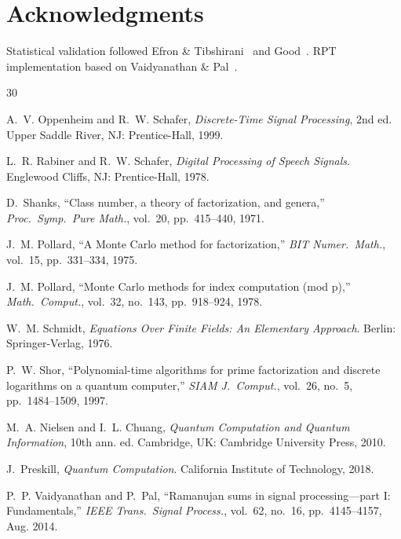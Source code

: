 \documentclass[10pt,twocolumn]{article}
\begin{document}
\section*{Acknowledgments}

Statistical validation followed Efron \& Tibshirani~\cite{efron1993} and Good~\cite{good2013}. RPT implementation based on Vaidyanathan \& Pal~\cite{vaidyanathan2014}.

\begin{thebibliography}{30}

A.~V. Oppenheim and R.~W. Schafer, \emph{Discrete-Time Signal Processing}, 2nd ed. Upper Saddle River, NJ: Prentice-Hall, 1999.

L.~R. Rabiner and R.~W. Schafer, \emph{Digital Processing of Speech Signals}. Englewood Cliffs, NJ: Prentice-Hall, 1978.

D.~Shanks, ``Class number, a theory of factorization, and genera,'' \emph{Proc.\ Symp.\ Pure Math.}, vol.~20, pp.~415--440, 1971.

J.~M. Pollard, ``A Monte Carlo method for factorization,'' \emph{BIT Numer.\ Math.}, vol.~15, pp.~331--334, 1975.

J.~M. Pollard, ``Monte Carlo methods for index computation (mod p),'' \emph{Math.\ Comput.}, vol.~32, no.~143, pp.~918--924, 1978.

W.~M. Schmidt, \emph{Equations Over Finite Fields: An Elementary Approach}. Berlin: Springer-Verlag, 1976.

P.~W. Shor, ``Polynomial-time algorithms for prime factorization and discrete logarithms on a quantum computer,'' \emph{SIAM J.\ Comput.}, vol.~26, no.~5, pp.~1484--1509, 1997.

M.~A. Nielsen and I.~L. Chuang, \emph{Quantum Computation and Quantum Information}, 10th ann. ed. Cambridge, UK: Cambridge University Press, 2010.

J.~Preskill, \emph{Quantum Computation}. California Institute of Technology, 2018.

P.~P. Vaidyanathan and P.~Pal, ``Ramanujan sums in signal processing---part I: Fundamentals,'' \emph{IEEE Trans.\ Signal Process.}, vol.~62, no.~16, pp.~4145--4157, Aug. 2014.


\end{thebibliography}
\end{document}
